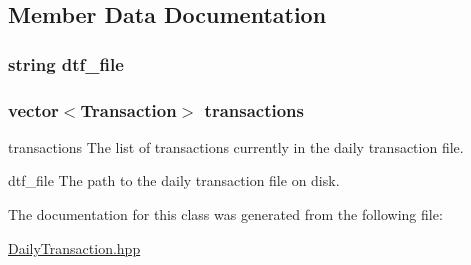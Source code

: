 \subsection{Member Data Documentation}
\hypertarget{class_daily_transaction_ae77e11b6ea857b9155c8b74d285a7323}{
\subsubsection[{dtf\-\_\-file}]{\setlength{\rightskip}{0pt plus 5cm}string dtf\-\_\-file\hspace{0.3cm}{\ttfamily [private]}}}\label{class_daily_transaction_ae77e11b6ea857b9155c8b74d285a7323}
\hypertarget{class_daily_transaction_ad8a3abd39eadee0df36b0211044a9f6d}{
\subsubsection[{transactions}]{\setlength{\rightskip}{0pt plus 5cm}vector$<${\bf Transaction}$>$ transactions\hspace{0.3cm}{\ttfamily [private]}}}\label{class_daily_transaction_ad8a3abd39eadee0df36b0211044a9f6d}


transactions The list of transactions currently in the daily transaction file. 

dtf\-\_\-file The path to the daily transaction file on disk. 

The documentation for this class was generated from the following file\-:\begin{DoxyCompactItemize}
\item 
\hyperlink{_daily_transaction_8hpp}{Daily\-Transaction.\-hpp}\end{DoxyCompactItemize}
